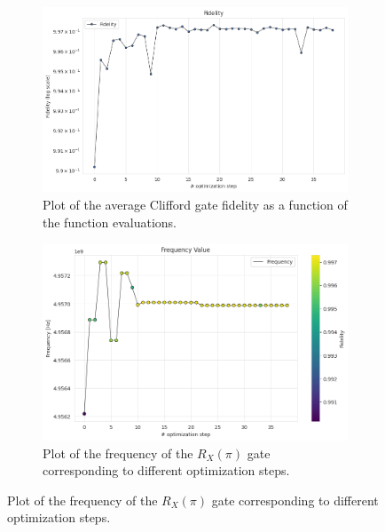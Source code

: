 \begin{figure}[h!]
    \centering
    \begin{subfigure}[t]{0.45\textwidth}
        \includegraphics[width=\textwidth]{figures/png/RB_optimization/NM/post_ft_true/NM_fid.png}
        \caption{Plot of the average Clifford gate fidelity as a function of the function evaluations.}
        \label{NM_true_fig:fidelity}
    \end{subfigure}
    \hfill
    \begin{subfigure}[t]{0.45\textwidth}
        \includegraphics[width=\textwidth]{figures/png/RB_optimization/NM/post_ft_true/frequency.png}
        \caption{Plot of the frequency of the $R_X(\pi)$ gate corresponding to different optimization steps.}
        \label{NM_true_fig:frequency}
    \end{subfigure}

    \vspace{0.5cm}


\end{figure}
